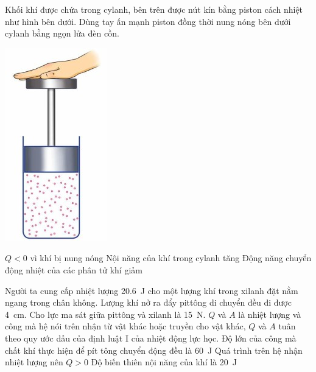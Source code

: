 \begin{ex}
	Khối khí được chứa trong cylanh, bên trên được nút kín bằng piston cách nhiệt như hình bên dưới. Dùng tay ấn mạnh piston đồng thời nung nóng bên dưới cylanh bằng ngọn lửa đèn cồn.
	\begin{center}
		\includegraphics[width=0.15\linewidth]{figs/VN12-Y24-PH-SYL-003P-3}
	\end{center}
	{$Q<0$ vì khí bị nung nóng}
	{\True Nội năng của khí trong cylanh tăng}
	{Động năng chuyển động nhiệt của các phân tử khí giảm}
\end{ex}
\begin{ex}
	Người ta cung cấp nhiệt lượng \SI{20.6}{\joule} cho một lượng khí trong xilanh đặt nằm ngang trong chân không. Lượng khí nở ra đẩy pittông di chuyển đều đi được \SI{4}{\centi\meter}. Cho lực ma sát giữa pittông và xilanh là \SI{15}{\newton}. $Q$ và $A$ là nhiệt lượng và công mà hệ nói trên nhận từ vật khác hoặc truyền cho vật khác, $Q$ và $A$ tuân theo quy ước dấu của định luật I của nhiệt động lực học.
	{Độ lớn của công mà chất khí thực hiện để pít tông chuyển động đều là \SI{60}{\joule}}
	{\True Quá trình trên hệ nhận nhiệt lượng nên $Q>0$}
	{\True Độ biến thiên nội năng của khí là \SI{20}{\joule}}
\end{ex}
